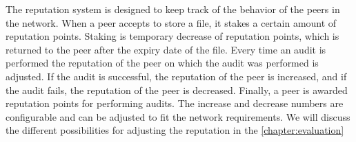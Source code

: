 The reputation system is designed to keep track of the behavior of the peers in the network.
When a peer accepts to store a file, it stakes a certain amount of reputation points.
Staking is temporary decrease of reputation points,
which is returned to the peer after the expiry date of the file.
Every time an audit is performed the reputation of the peer on which the audit was performed is adjusted.
If the audit is successful, the reputation of the peer is increased,
and if the audit fails, the reputation of the peer is decreased.
Finally, a peer is awarded reputation points for performing audits.
The increase and decrease numbers are configurable and can be adjusted to fit the network requirements.
We will discuss the different possibilities for adjusting the reputation in the \autoref{chapter:evaluation}
